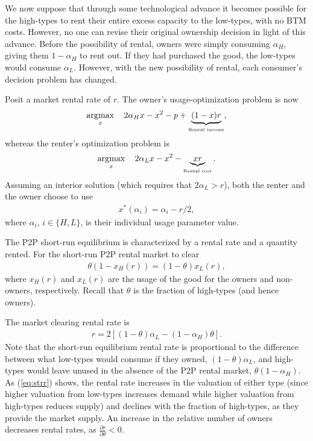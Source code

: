 \documentclass[11pt]{article}
\DeclareMathOperator*{\argmax}{\arg\!\max}
\begin{document}
We now suppose that through some technological advance it becomes possible for the high-types to rent their entire excess capacity to the low-types, with no BTM costs.
However, no one can revise their original ownership decision in light of this advance. 
Before the possibility of rental, owners were simply consuming $\alpha_H$, giving them $1-\alpha_H$ to rent out.
If they had purchased the good, the low-types would consume $\alpha_L$. 
However, with the new possibility of rental, each consumer's decision problem has changed. 

Posit a market rental rate of $r$. 
The owner's usage-optimization problem is now 
\begin{align}
\argmax_x \quad 2\alpha_H x - x^2 -p + \underbrace{(1-x)r}_{\mbox{{\tiny Rental income}}},   \nonumber 
\end{align} 
whereas the renter's optimization problem is 
\begin{align}
\argmax_x \quad 2 \alpha_L x - x^2 - \underbrace{xr}_{\mbox{{\tiny Rental cost}}}.  \nonumber
\end{align} 
Assuming an interior solution (which requires that $2\alpha_L > r$), both the renter and the owner choose to use
\begin{align}
x^*(\alpha_i) = \alpha_i - r/2, 
\end{align} 
where $\alpha_i$, $i \in \{H,L\}$, is their individual usage parameter value. 

The P2P short-run equilibrium is characterized by a rental rate and a quantity rented. 
For the short-run P2P rental market to clear 
\begin{align}
  \theta \left( 1 - x_H(r) \right) = (1-\theta) x_L(r),
\end{align}
where $x_H(r)$ and $x_L(r)$ are the usage of the good for the owners and non-owners, respectively.
Recall that $\theta$ is the fraction of high-types (and hence owners).

The market clearing rental rate is 
\begin{align} \label{eq:strr} 
r = 2\left[ (1-\theta)\alpha_L - (1-\alpha_H) \theta \right]. 
\end{align}
Note that the short-run equilibrium rental rate is proportional to the difference between what low-types would consume if they owned, $(1-\theta)\alpha_L$, and high-types would leave unused in the absence of the P2P rental market, $\theta (1-\alpha_H)$. 
As (\ref{eq:strr}) shows, the rental rate increases in the valuation of either type (since higher valuation from low-types increases demand while higher valuation from high-types reduces supply) and declines with the fraction of high-types, as they provide the market supply. 
An increase in the relative number of owners decreases rental rates, as $\frac{\partial r}{\partial \theta} < 0$. 
\end{document}
